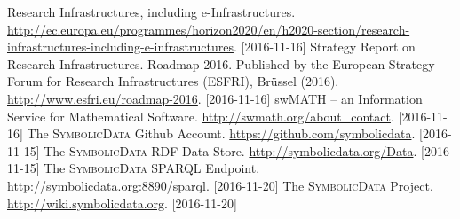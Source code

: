 \documentclass{mathincs}
\newcommand{\SD}{\textsc{Symbo\-lic\-Data}}
\begin{document}
\begin{thebibliography}{00}
 Research Infrastructures, including e-Infrastructures.
  \url{http://ec.europa.eu/programmes/horizon2020/en/h2020-section/research-infrastructures-including-e-infrastructures}.
      [2016-11-16]
 Strategy Report on Research Infrastructures.  Roadmap 2016.
  Published by the European Strategy Forum for Research Infrastructures
  (ESFRI), Br\"ussel (2016).  \url{http://www.esfri.eu/roadmap-2016}.
  [2016-11-16]
 swMATH -- an Information Service for Mathematical Software.
  \newblock \url{http://swmath.org/about_contact}. [2016-11-16]
 The {\SD} Github Account.
  \url{https://github.com/symbolicdata}.  [2016-11-15]
 The {\SD} RDF Data Store.
  \url{http://symbolicdata.org/Data}.  [2016-11-15] 
 The {\SD} SPARQL Endpoint. 
   \url{http://symbolicdata.org:8890/sparql}. [2016-11-20]
 The {\SD} Project.  \url{http://wiki.symbolicdata.org}.
  [2016-11-20]
\end{thebibliography}
\end{document}
